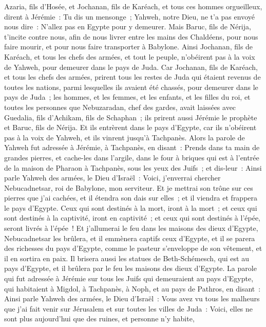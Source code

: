 \begin{multicols}{2}
Azaria, fils d'Hosée, et Jochanan, fils de Karéach, et tous ces hommes orgueilleux, dirent à Jérémie~: Tu dis un mensonge~; Yahweh, notre Dieu, ne t'a pas envoyé nous dire~: N'allez pas en Egypte pour y demeurer.
Mais Baruc, fils de Nérija, t'incite contre nous, afin de nous livrer entre les mains des Chaldéens, pour nous faire mourir, et pour nous faire transporter à Babylone.
Ainsi Jochanan, fils de Karéach, et tous les chefs des armées, et tout le peuple, n'obéirent pas à la voix de Yahweh, pour demeurer dans le pays de Juda.
Car Jochanan, fils de Karéach, et tous les chefs des armées, prirent tous les restes de Juda qui étaient revenus de toutes les nations, parmi lesquelles ils avaient été chassés, pour demeurer dans le pays de Juda~;
les hommes, et les femmes, et les enfants, et les filles du roi, et toutes les personnes que Nebuzaradan, chef des gardes, avait laissées avec Guedalia, fils d'Achikam, fils de Schaphan~; ils prirent aussi Jérémie le prophète et Baruc, fils de Nérija.
Et ils entrèrent dans le pays d'Egypte, car ils n'obéirent pas à la voix de Yahweh, et ils vinrent jusqu'à Tachpanès.
Alors la parole de Yahweh fut adressée à Jérémie, à Tachpanès, en disant~:
Prends dans ta main de grandes pierres, et cache-les dans l'argile, dans le four à briques qui est à l'entrée de la maison de Pharaon à Tachpanès, sous les yeux des Juifs~;
et dis-leur~: Ainsi parle Yahweh des armées, le Dieu d'Israël~: Voici, j'enverrai chercher Nebucadnetsar, roi de Babylone, mon serviteur. Et je mettrai son trône sur ces pierres que j'ai cachées, et il étendra son dais sur elles~;
et il viendra et frappera le pays d'Egypte. Ceux qui sont destinés à la mort, iront à la mort~; et ceux qui sont destinés à la captivité, iront en captivité~; et ceux qui sont destinés à l'épée, seront livrés à l'épée~!
Et j'allumerai le feu dans les maisons des dieux d'Egypte, Nebucadnetsar les brûlera, et il emmènera captifs ceux d'Egypte, et il se parera des richesses du pays d'Egypte, comme le pasteur s'enveloppe de son vêtement, et il en sortira en paix.
Il brisera aussi les statues de Beth-Schémesch, qui est au pays d'Egypte, et il brûlera par le feu les maisons des dieux d'Egypte.
\VerseOne{}La parole qui fut adressée à Jérémie sur tous les Juifs qui demeuraient au pays d'Egypte, qui habitaient à Migdol, à Tachpanès, à Noph, et au pays de Pathros, en disant~:
Ainsi parle Yahweh des armées, le Dieu d'Israël~: Vous avez vu tous les malheurs que j'ai fait venir sur Jérusalem et sur toutes les villes de Juda~: Voici, elles ne sont plus aujourd'hui que des ruines, et personne n'y habite,

\end{multicols}
